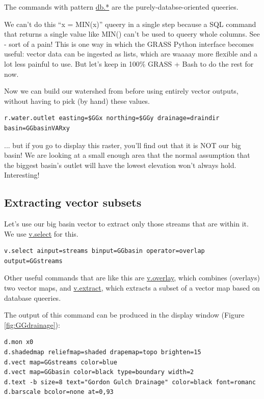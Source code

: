 \documentclass{book}
\begin{document}
The commands with pattern \url{db.*} are the purely-databse-oriented queeries.

We can't do this ``x = MIN(x)'' queery in a single step because a SQL command that returns a single value like MIN() can't be used to queery whole columns. See - sort of a pain! This is one way in which the GRASS Python interface becomes useful: vector data can be ingested as lists, which are waaaay more flexible and a lot less painful to use. But let's keep in 100\% GRASS + Bash to do the rest for now.

Now we can build our watershed from before using entirely vector outputs, without having to pick (by hand) these values.

\begin{lstlisting}
r.water.outlet easting=$GGx northing=$GGy drainage=draindir basin=GGbasinVARxy
\end{lstlisting}

... but if you go to display this raster, you'll find out that it is NOT our big basin! We are looking at a small enough area that the normal assumption that the biggest basin's outlet will have the lowest elevation won't always hold. Interesting!

\subsection{Extracting vector subsets}

Let's use our big basin vector to extract only those streams that are within it. We use \url{v.select} for this.

\begin{lstlisting}
v.select ainput=streams binput=GGbasin operator=overlap output=GGstreams
\end{lstlisting}

Other useful commands that are like this are \url{v.overlay}, which combines (overlays) two vector maps, and \url{v.extract}, which extracts a subset of a vector map based on database queeries.

The output of this command can be produced in the display window (Figure \ref{fig:GGdrainage}):

\begin{lstlisting}
d.mon x0
d.shadedmap reliefmap=shaded drapemap=topo brighten=15
d.vect map=GGstreams color=blue
d.vect map=GGbasin color=black type=boundary width=2
d.text -b size=8 text="Gordon Gulch Drainage" color=black font=romanc
d.barscale bcolor=none at=0,93
\end{lstlisting}
\end{document}
